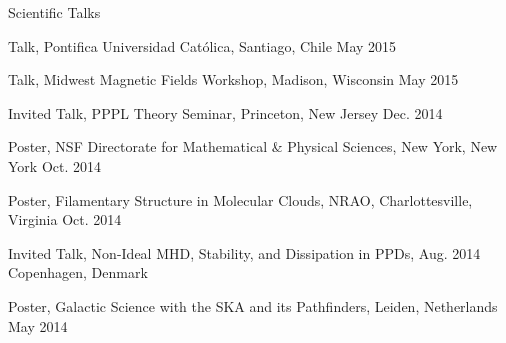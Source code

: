 \documentclass{resume_clark} %
\begin{document}
\begin{rSection}{Scientific Talks}
\begin{etaremune}
\item Talk, Pontifica Universidad Cat\'olica, Santiago, Chile \hfill {May 2015}

\item Talk, Midwest Magnetic Fields Workshop, Madison, Wisconsin \hfill {May 2015}

\item Invited Talk, PPPL Theory Seminar, Princeton, New Jersey \hfill {Dec. 2014}

\item Poster, NSF Directorate for Mathematical \& Physical Sciences, New York, New York \hfill {Oct. 2014}

\item Poster, Filamentary Structure in Molecular Clouds, NRAO, Charlottesville, Virginia \hfill {Oct. 2014}

\item Invited Talk, Non-Ideal MHD, Stability, and Dissipation in PPDs, \hfill {Aug. 2014} \\ Copenhagen, Denmark 

\item Poster, Galactic Science with the SKA and its Pathfinders, Leiden, Netherlands \hfill {May 2014}


\end{etaremune}
\end{rSection}
\end{document}
